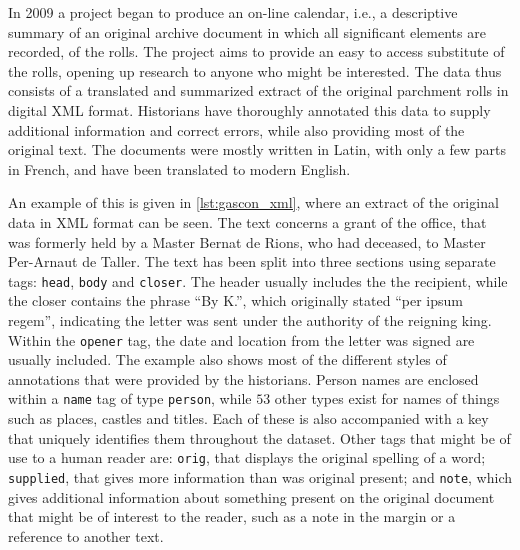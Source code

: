 
In 2009 a project began to produce an on-line calendar, i.e., a descriptive summary of an original archive document in which all significant elements are recorded, of the rolls.
The project aims to provide an easy to access substitute of the rolls, opening up research to anyone who might be interested.
The data thus consists of a translated and summarized extract of the original parchment rolls in digital XML format.
Historians have thoroughly annotated this data to supply additional information and correct errors, while also providing most of the original text.
The documents were mostly written in Latin, with only a few parts in French, and have been translated to modern English.

An example of this is given in \cref{lst:gascon_xml}, where an extract of the original data in XML format can be seen.
The text concerns a grant of the office, that was formerly held by a Master Bernat de Rions, who had deceased, to Master Per-Arnaut de Taller.
The text has been split into three sections using separate tags: \texttt{head}, \texttt{body} and \texttt{closer}.
The header usually includes the the recipient, while the closer contains the phrase ``By K.'', which originally stated ``per ipsum regem'', indicating the letter was sent under the authority of the reigning king.
Within the \texttt{opener} tag, the date and location from the letter was signed are usually included.
The example also shows most of the different styles of annotations that were provided by the historians.
Person names are enclosed within a \texttt{name} tag of type \texttt{person}, while $53$ other types exist for names of things such as places, castles and titles.
Each of these is also accompanied with a key that uniquely identifies them throughout the dataset.
Other tags that might be of use to a human reader are: \texttt{orig}, that displays the original spelling of a word; \texttt{supplied}, that gives more information than was original present; and \texttt{note}, which gives additional information about something present on the original document that might be of interest to the reader, such as a note in the margin or a reference to another text.

